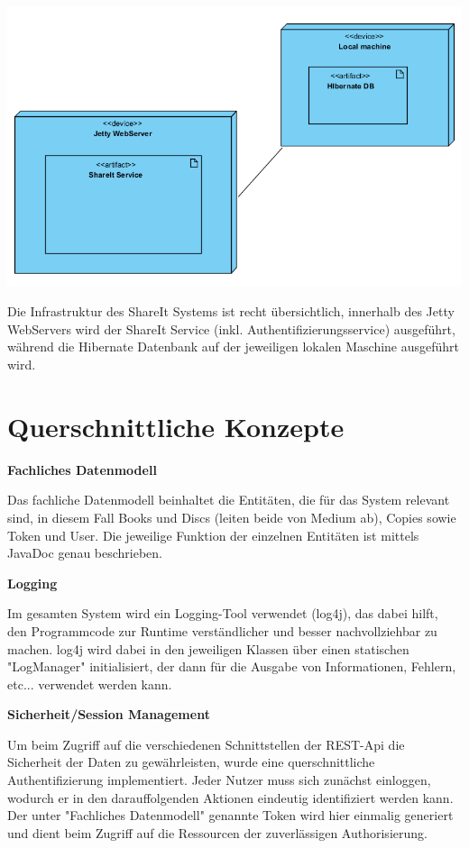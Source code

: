 \documentclass[]{article}
\begin{document}
\includegraphics{images/UMLDeploymentDiag.PNG}

Die Infrastruktur des ShareIt Systems ist recht übersichtlich, innerhalb des Jetty WebServers wird der ShareIt Service (inkl. Authentifizierungsservice) ausgeführt, während die Hibernate Datenbank auf der jeweiligen lokalen Maschine ausgeführt wird.



\section{Querschnittliche Konzepte}\label{section-concepts}



\textbf{Fachliches Datenmodell}

Das fachliche Datenmodell beinhaltet die Entitäten, die für das System relevant sind, in diesem Fall Books und Discs (leiten beide von Medium ab), Copies sowie Token und User. Die jeweilige Funktion der einzelnen Entitäten ist mittels JavaDoc genau beschrieben.

\textbf{Logging}

Im gesamten System wird ein Logging-Tool verwendet (log4j), das dabei hilft, den Programmcode zur Runtime verständlicher und besser nachvollziehbar zu machen. log4j wird dabei in den jeweiligen Klassen über einen statischen "LogManager" initialisiert, der dann für die Ausgabe von Informationen, Fehlern, etc... verwendet werden kann.


\textbf{Sicherheit/Session Management}

Um beim Zugriff auf die verschiedenen Schnittstellen der REST-Api die Sicherheit der Daten zu gewährleisten, wurde eine querschnittliche Authentifizierung implementiert. Jeder Nutzer muss sich zunächst einloggen, wodurch er in den darauffolgenden Aktionen eindeutig identifiziert werden kann. Der unter "Fachliches Datenmodell" genannte Token wird hier einmalig generiert und dient beim Zugriff auf die Ressourcen der zuverlässigen Authorisierung.
\end{document}
